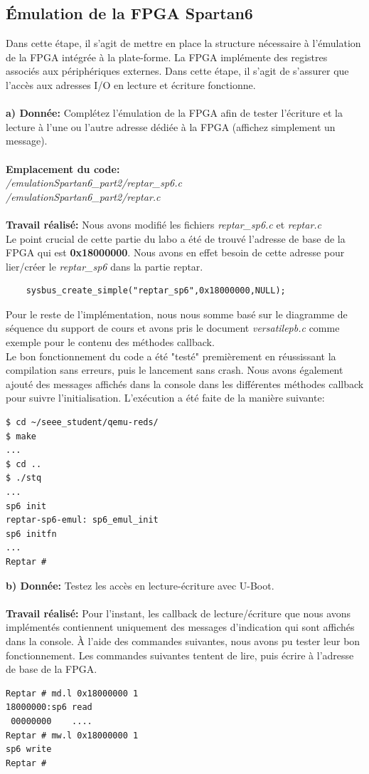 \subsection{Émulation de la FPGA Spartan6}
Dans cette étape, il s'agit de mettre en place la structure nécessaire à l'émulation de la FPGA intégrée
à la plate-forme. La FPGA implémente des registres associés aux périphériques externes. Dans cette
étape, il s'agit de s'assurer que l'accès aux adresses I/O en lecture et écriture fonctionne. \\\\
\textbf{a) Donnée: }Complétez l'émulation de la FPGA afin de tester l'écriture et la lecture à l'une ou l'autre adresse
dédiée à la FPGA (affichez simplement un message). \\\\
\textbf{Emplacement du code:}\\\textit{/emulationSpartan6\_part2/reptar\_sp6.c}\\ \textit{/emulationSpartan6\_part2/reptar.c}\\\\
\textbf{Travail réalisé: }Nous avons modifié les fichiers \textit{reptar\_sp6.c} et \textit{reptar.c}\\
Le point crucial de cette partie du labo a été de trouvé l'adresse de base de la FPGA qui est \textbf{0x18000000}. Nous avons en effet besoin de cette adresse pour lier/créer le \textit{reptar\_sp6} dans la partie reptar. 
\begin{lstlisting}
	sysbus_create_simple("reptar_sp6",0x18000000,NULL);
\end{lstlisting}
Pour le reste de l'implémentation, nous nous somme basé sur le diagramme de séquence du support de cours et avons pris le document \textit{versatilepb.c} comme exemple pour le contenu des méthodes callback.\\
Le bon fonctionnement du code a été "testé" premièrement en réussissant la compilation sans erreurs, puis le lancement sans crash. Nous avons également ajouté des messages affichés dans la console dans les différentes méthodes callback pour suivre l'initialisation. L'exécution a été faite de la manière suivante:
\begin{lstlisting}
$ cd ~/seee_student/qemu-reds/
$ make
...
$ cd ..
$ ./stq
...
sp6 init
reptar-sp6-emul: sp6_emul_init
sp6 initfn
...
Reptar # 
\end{lstlisting}
\textbf{b) Donnée: }Testez les accès en lecture-écriture avec U-Boot. \\\\
\textbf{Travail réalisé: } Pour l'instant, les callback de lecture/écriture que nous avons implémentés contiennent uniquement des messages d'indication qui sont affichés dans la console. À l'aide des commandes suivantes, nous avons pu tester leur bon fonctionnement. Les commandes suivantes tentent de lire, puis écrire à l'adresse de base de la FPGA.
\begin{lstlisting}
Reptar # md.l 0x18000000 1
18000000:sp6 read
 00000000    ....
Reptar # mw.l 0x18000000 1
sp6 write
Reptar #
\end{lstlisting}
